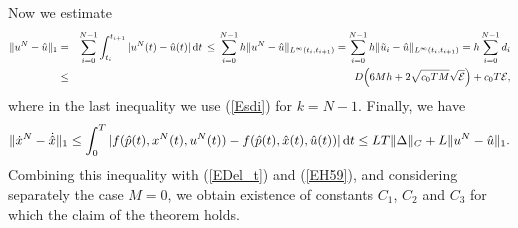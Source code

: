 \documentclass[11pt]{article}
\newcommand{\bd}{\begin{displaymath}}
\newcommand{\ed}{\end{displaymath}}
\newcommand{\bea}{\begin{eqnarray}}
\newcommand{\eea}{\end{eqnarray}}
\newcommand{\E}{{\cal E}}
\newcommand{\dd}{\mbox{\rm\,d}}
\begin{document}
Now we estimate
\bea
        \nonumber   \| u^N - \hat u\|_1 &=& \sum_{i=0}^{N-1} \int_{t_i}^{t_{i+1}}|u^N(t) - \hat u(t)| \dd t
     \,\leq \, \sum_{i=0}^{N-1} h \|u^N - \hat u\|_{L^\infty(t_i,t_{i+1})} 
            = \sum_{i=0}^{N-1} h \|\tilde u_i - \hat u\|_{L^\infty(t_i,t_{i+1})} 
    =  h \sum_{i=0}^{N-1} d_i \\ &\leq& D \Big( 6Mh  + 2 \sqrt{c_0 TM} \sqrt{\E}\Big) +  c_0 T \E, \label{EH59}
\eea
where in the last inequality we use (\ref{Esdi}) for $k = N-1$. 
Finally, we have
\bd
      \| \dot x^N - \dot{\hat x}\|_1 \leq \int_0^T | f(\hat p(t), x^N(t), u^N(t)) -  f(\hat p(t), \hat x(t), \hat u(t))| \dd t
       \leq LT \| \Delta \|_C + L \| u^N - \hat u \|_1.
\ed
Combining this inequality with (\ref{EDel_t}) and (\ref{EH59}), and considering separately the case $M = 0$,
we obtain existence of constants $C_1$, $C_2$ and $C_3$ for which the claim of the theorem holds. 

\vspace{2cm}
\end{document}
